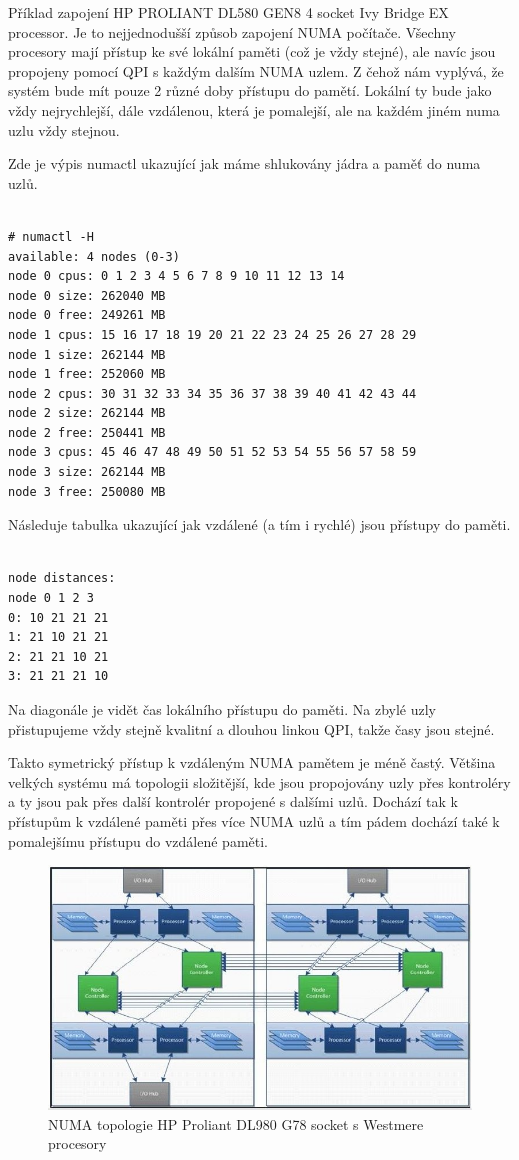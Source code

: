 \documentclass[a4paper,12pt]{article}
\begin{document}
Příklad zapojení HP PROLIANT DL580 GEN8 4 socket Ivy Bridge EX processor.
Je to nejjednodušší způsob zapojení NUMA počítače. Všechny procesory mají přístup ke své lokální paměti (což je vždy stejné), ale navíc jsou propojeny pomocí QPI s každým dalším NUMA uzlem. Z čehož nám vyplývá, že systém bude mít pouze 2 různé doby přístupu do pamětí. Lokální ty bude jako vždy nejrychlejší, dále vzdálenou, která je pomalejší, ale na každém jiném numa uzlu vždy stejnou.

Zde je výpis numactl ukazující jak máme shlukovány jádra a paměť do numa uzlů.

\begin{verbatim} 

# numactl -H
available: 4 nodes (0-3)
node 0 cpus: 0 1 2 3 4 5 6 7 8 9 10 11 12 13 14
node 0 size: 262040 MB
node 0 free: 249261 MB
node 1 cpus: 15 16 17 18 19 20 21 22 23 24 25 26 27 28 29
node 1 size: 262144 MB
node 1 free: 252060 MB
node 2 cpus: 30 31 32 33 34 35 36 37 38 39 40 41 42 43 44
node 2 size: 262144 MB
node 2 free: 250441 MB
node 3 cpus: 45 46 47 48 49 50 51 52 53 54 55 56 57 58 59
node 3 size: 262144 MB
node 3 free: 250080 MB

\end{verbatim}

Následuje tabulka ukazující jak vzdálené (a tím i rychlé) jsou přístupy do paměti.

\begin{verbatim}

node distances:
node 0 1 2 3
0: 10 21 21 21
1: 21 10 21 21
2: 21 21 10 21
3: 21 21 21 10

\end{verbatim}

Na diagonále je vidět čas lokálního přístupu do paměti. Na zbylé uzly přistupujeme vždy stejně kvalitní a dlouhou linkou QPI, takže časy jsou stejné.

Takto symetrický přístup k vzdáleným NUMA pamětem je méně častý. Většina velkých systému má topologii složitější, kde jsou propojovány uzly přes kontroléry a ty jsou pak přes další kontrolér propojené s dalšími uzlů. Dochází tak k přístupům k vzdálené paměti přes více NUMA uzlů a tím pádem dochází také k pomalejšímu přístupu do vzdálené paměti.

\begin{figure}[ht]
\includegraphics[scale=0.7]{obrazky/numa-scheme-big-system.jpeg}
\caption{NUMA topologie HP Proliant DL980 G78 socket s Westmere procesory}
\label{NUMA scheme2}
\end{figure}
\end{document}

